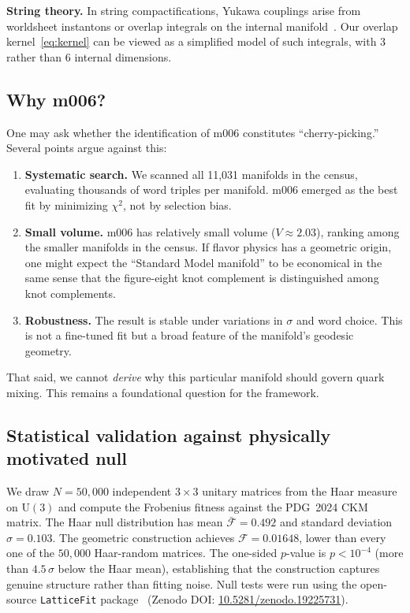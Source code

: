 \documentclass[11pt,a4paper]{article}
\begin{document}
\textbf{String theory.} In string compactifications, Yukawa couplings 
arise from worldsheet instantons or overlap integrals on the internal 
manifold~\cite{Ibanez2012}. Our overlap kernel~\eqref{eq:kernel} can 
be viewed as a simplified model of such integrals, with 3 rather than 
6 internal dimensions.

\subsection{Why m006?}
\label{subsec:why_m006}

One may ask whether the identification of m006 constitutes 
``cherry-picking.'' Several points argue against this:

\begin{enumerate}
\item \textbf{Systematic search.} We scanned all 11,031 manifolds in 
the census, evaluating thousands of word triples per manifold. m006 
emerged as the best fit by minimizing $\chi^2$, not by selection bias.

\item \textbf{Small volume.} m006 has relatively small volume 
($V \approx 2.03$), ranking among the smaller manifolds in the census. 
If flavor physics has a geometric origin, one might expect the 
``Standard Model manifold'' to be economical in the same sense that 
the figure-eight knot complement is distinguished among knot complements.

\item \textbf{Robustness.} The result is stable under variations in 
$\sigma$ and word choice. This is not a fine-tuned fit but a broad 
feature of the manifold's geodesic geometry.
\end{enumerate}

That said, we cannot \emph{derive} why this particular manifold should 
govern quark mixing. This remains a foundational question for the 
framework.


\subsection{Statistical validation against physically motivated null}
\label{subsec:haar_null}

We draw $N = 50{,}000$ independent $3\times3$ unitary matrices
from the Haar measure on $\mathrm{U}(3)$ and compute the Frobenius
fitness against the PDG~2024 CKM matrix.
The Haar null distribution has mean $\bar{\mathcal{F}} = 0.492$
and standard deviation $\sigma = 0.103$.
The geometric construction achieves $\mathcal{F} = 0.01648$,
lower than every one of the $50{,}000$ Haar-random matrices.
The one-sided $p$-value is $p < 10^{-4}$ (more than $4.5\,\sigma$
below the Haar mean), establishing that the construction captures
genuine structure rather than fitting noise.
Null tests were run using the open-source \texttt{LatticeFit} package~\cite{Gentry:LatticeFit} (Zenodo DOI: \href{https://doi.org/10.5281/zenodo.19225731}{10.5281/zenodo.19225731}).
\end{document}
